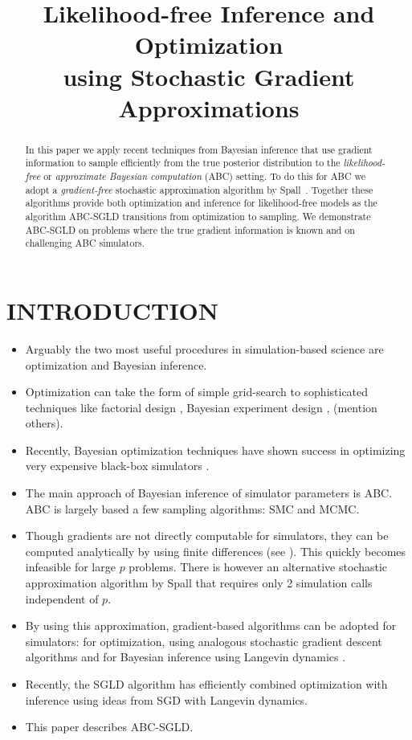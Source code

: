 \documentclass[]{article}
\date{}
\title{Likelihood-free Inference and Optimization \\ using Stochastic Gradient Approximations}
\author{} %
\begin{document}
 
	\vskip -0.3in
  
\maketitle

% 
% 
% 
\begin{abstract} 
In this paper we apply recent techniques from Bayesian inference that use gradient information to sample efficiently from the true posterior distribution to the {\em likelihood-free} or {\em approximate Bayesian computation} (ABC) setting.  To do this for ABC we adopt a {\em gradient-free} stochastic approximation algorithm by Spall~\cite{spall1999}.  Together these algorithms provide both optimization and inference for likelihood-free models as the algorithm ABC-SGLD transitions from optimization to sampling.  We demonstrate ABC-SGLD on problems where the true gradient information is known and on challenging ABC simulators.
\end{abstract} 

\section{INTRODUCTION} \label{introduction}
\begin{itemize}
  \item  Arguably the two most useful procedures in simulation-based science are optimization and Bayesian inference.  
  \item  Optimization can take the form of simple grid-search to sophisticated techniques like factorial design \cite{factorialdesign}, Bayesian experiment design \cite{bayesexpdesign}, (mention others).
  \item Recently, Bayesian optimization techniques have shown success in optimizing very expensive black-box simulators \cite{bosuccess}.
  \item The main approach of Bayesian inference of simulator parameters is ABC.  ABC is largely based a few sampling algorithms: SMC and MCMC.  
  \item Though gradients are not directly computable for simulators, they can be computed analytically by using finite differences (see \cite{kiefer1952}).  This quickly becomes infeasible for large $p$ problems.  There is however an alternative stochastic approximation algorithm by Spall \cite{spall1999} that requires only 2 simulation calls independent of $p$.  
  \item By using this approximation, gradient-based algorithms can be adopted for simulators: for optimization, using analogous stochastic gradient descent algorithms and for Bayesian inference using Langevin dynamics \cite{langevin}.
  \item Recently, the SGLD \cite{wellingsgld} algorithm has efficiently combined optimization with inference using ideas from SGD with Langevin dynamics.
  \item This paper describes ABC-SGLD.
\end{itemize}
\end{document}

